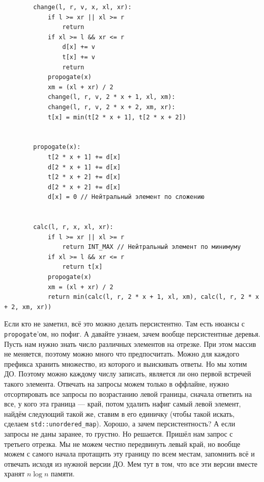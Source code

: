 \documentclass{article}
\newcommand{\pseudo}{PseudoLexer.py:PseudoLexer -x}
\newcommand{\pseudocode}[1]{\texttt{#1}}
\begin{document}
    \begin{verbatim}
        change(l, r, v, x, xl, xr):
            if l >= xr || xl >= r
                return
            if xl >= l && xr <= r
                d[x] += v
                t[x] += v
                return
            propogate(x)
            xm = (xl + xr) / 2
            change(l, r, v, 2 * x + 1, xl, xm):
            change(l, r, v, 2 * x + 2, xm, xr):
            t[x] = min(t[2 * x + 1], t[2 * x + 2])


        propogate(x):
            t[2 * x + 1] += d[x]
            d[2 * x + 1] += d[x]
            t[2 * x + 2] += d[x]
            d[2 * x + 2] += d[x]
            d[x] = 0 // Нейтральный элемент по сложению


        calc(l, r, x, xl, xr):
            if l >= xr || xl >= r
                return INT_MAX // Нейтральный элемент по минимуму
            if xl >= l && xr <= r
                return t[x]
            propogate(x)
            xm = (xl + xr) / 2
            return min(calc(l, r, 2 * x + 1, xl, xm), calc(l, r, 2 * x + 2, xm, xr))
    \end{verbatim}
    Если кто не заметил, всё это можно делать персистентно. Там есть нюансы с \pseudocode{propogate}'ом, но пофиг. А давайте узнаем, зачем вообще персистентные деревья. Пусть нам нужно знать число различных элементов на отрезке. При этом массив не меняется, поэтому можно много что предпосчитать. Можно для каждого префикса хранить множество, из которого и выискивать ответы. Но мы хотим ДО. Поэтому можно каждому числу записать, является ли оно первой встречей такого элемента. Отвечать на запросы можем только в оффлайне, нужно отсортировать все запросы по возрастанию левой границы, сначала ответить на все, у кого эта граница --- край, потом удалить нафиг самый левой элемент, найдём следующий такой же, ставим в его единичку (чтобы такой искать, сделаем \texttt{std::unordered_map}). Хорошо, а зачем персистентность? А если запросы не даны заранее, то грустно. Но решается. Пришёл нам запрос с третьего отрезка. Мы не можем честно передвинуть левый край, но вообще можем с самого начала протащить эту границу по всем местам, запомнить всё и отвечать исходя из нужной версии ДО. Мем тут в том, что все эти версии вместе хранят $n\log n$ памяти.
\end{document}
